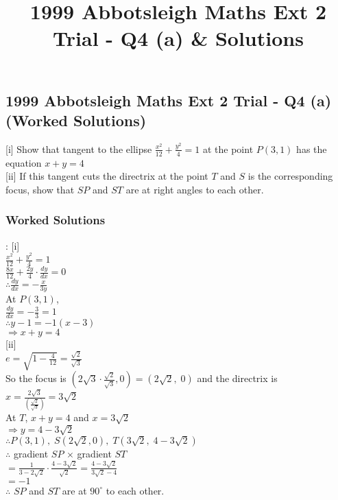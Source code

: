 \documentclass[10pt,a4paper]{report}
\title{1999 Abbotsleigh Maths Ext 2 Trial - Q4 (a) & Solutions}
\theoremstyle{thm}
\begin{document}
\subsection*{1999 Abbotsleigh Maths Ext 2 Trial - Q4 (a) (Worked Solutions)}
[i] Show that tangent to the ellipse $\displaystyle\frac{{{x^2}}}{{12}} + 
\frac{{{y^2}}}{4} = 1$ at the point $P\left( {3,1} \right)$ has the equation $x 
+ y = 4$\\[1em]
[ii] If this tangent cuts the directrix at the point $T$ and $S$ is the 
corresponding focus, show that $SP$ and $ST$ are at right angles to each 
other.\\
\subsubsection{Worked Solutions}:
[i]\\
$\displaystyle \frac{{{x^2}}}{{12}} + \frac{{{y^2}}}{4} = 1$\\
$\displaystyle \frac{{8x}}{{12}} + \frac{{2y}}{4} \cdot \frac{{dy}}{{dx}} = 0$\\
$\therefore \frac{{dy}}{{dx}} =  - \frac{x}{{3y}}$\\[1em]
At $P\left( {3,1} \right)$, \\
$\displaystyle \frac{{dy}}{{dx}} =  - \frac{3}{3} = 1$\\
$\therefore y - 1 =  - 1\left( {x - 3} \right)$\\
$ \Rightarrow x + y = 4$\\[1em]
[ii]\\
$e = \sqrt {1 - \frac{4}{{12}}}  = \frac{{\sqrt 2 }}{{\sqrt 3 }}$\\
So the focus is $\left( {2\sqrt 3  \cdot \frac{{\sqrt 2 }}{{\sqrt 3 }},0} \right) = \left( {2\sqrt 2 ,\;0} \right)$ and the directrix is $x = \frac{{2\sqrt 3 }}{{\left( {\frac{{\sqrt 2 }}{{\sqrt 3 }}} \right)}} = 3\sqrt 2 $\\[1em]
At $T$, $x + y = 4$ and $x = 3\sqrt 2 $\\
$ \Rightarrow y = 4 - 3\sqrt 2 $\\
$\therefore P\left( {3,1} \right),\;S\left( {2\sqrt 2 ,0} \right),\;T\left( {3\sqrt 2 ,\;4 - 3\sqrt 2 } \right)$\\[1em]
$\therefore $ gradient $SP$ $ \times $ gradient $ST$\\
$ = \frac{1}{{3 - 2\sqrt 2 }} \cdot \frac{{4 - 3\sqrt 2 }}{{\sqrt 2 }} = \frac{{4 - 3\sqrt 2 }}{{3\sqrt 2  - 4}}$\\
$ =  - 1$\\[1em]
$\therefore $ $SP$ and $ST$ are at $90^\circ $ to each other.\\
\end{document}
